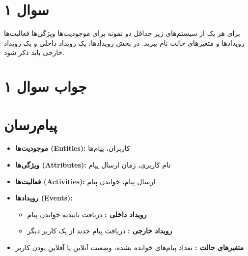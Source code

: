 \section*{سوال ۱}

برای هر یک از سیستم‌های زیر حداقل دو نمونه برای موجودیت‌ها 
ویژگی‌ها 
فعالیت‌ها 
رویدادها 
و متغیرهای حالت 
نام ببرید. در بخش رویدادها، یک رویداد داخلی 
و یک رویداد خارجی 
باید ذکر شود.

\section*{جواب سوال ۱}

\section*{پیام‌رسان}
\begin{itemize}
	\item \textbf{موجودیت‌ها (Entities):} کاربران، پیام‌ها
	\item \textbf{ویژگی‌ها (Attributes):} نام کاربری، زمان ارسال پیام
	\item \textbf{فعالیت‌ها (Activities):} ارسال پیام، خواندن پیام
	\item \textbf{رویدادها (Events):} 
	\begin{itemize}
		\item \textbf{رویداد داخلی :} دریافت تاییدیه خواندن پیام
		\item \textbf{رویداد خارجی :} دریافت پیام جدید از یک کاربر دیگر
	\end{itemize}
	\item \textbf{متغیرهای حالت :} تعداد پیام‌های خوانده نشده، وضعیت آنلاین یا آفلاین بودن کاربر
\end{itemize}

